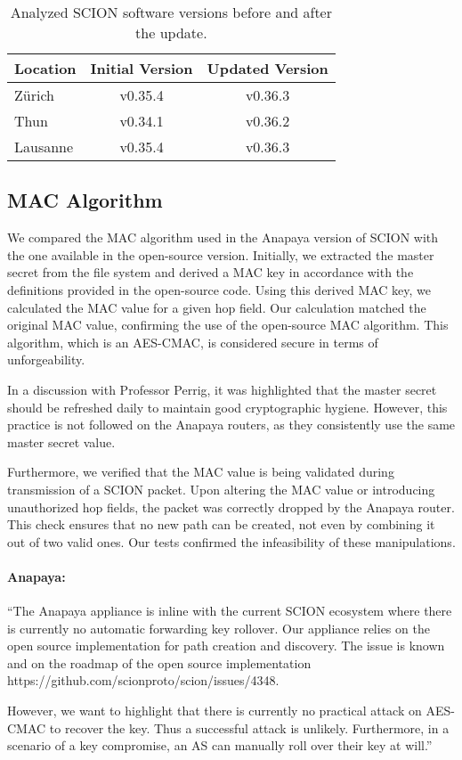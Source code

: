 \begin{table}[H]
    \centering
    \begin{tabular}{|l|c|c|}
        \hline
        \textbf{Location} & \textbf{Initial Version} & \textbf{Updated Version} \\
        \hline
        Zürich & v0.35.4 & v0.36.3 \\
        \hline
        Thun & v0.34.1 & v0.36.2 \\
        \hline
        Lausanne & v0.35.4 & v0.36.3 \\
        \hline
    \end{tabular}
    \caption{Analyzed SCION software versions before and after the update.}
    \label{tab:software_scion_versions}
\end{table}

\subsection{MAC Algorithm}
\label{sec:mac-algorithm}
We compared the MAC algorithm used in the Anapaya version of SCION with the one available in the open-source version.
Initially, we extracted the master secret from the file system and derived a MAC key in accordance with the definitions provided in the open-source code.
Using this derived MAC key, we calculated the MAC value for a given hop field.
Our calculation matched the original MAC value, confirming the use of the open-source MAC algorithm.
This algorithm, which is an AES-CMAC, is considered secure in terms of unforgeability.

In a discussion with Professor Perrig, it was highlighted that the master secret should be refreshed daily to maintain good cryptographic hygiene.
However, this practice is not followed on the Anapaya routers, as they consistently use the same master secret value.

Furthermore, we verified that the MAC value is being validated during transmission of a SCION packet.
Upon altering the MAC value or introducing unauthorized hop fields, the packet was correctly dropped by the Anapaya router.
This check ensures that no new path can be created, not even by combining it out of two valid ones.
Our tests confirmed the infeasibility of these manipulations.

\begin{boxH}
\paragraph{Anapaya:}
``The Anapaya appliance is inline with the current SCION ecosystem where there is currently no automatic forwarding key rollover. Our appliance relies on the open source implementation for path creation and discovery.
The issue is known and on the roadmap of the open source implementation https://github.com/scionproto/scion/issues/4348.

However, we want to highlight that there is currently no practical attack on AES-CMAC to recover the key.
Thus a successful attack is unlikely. Furthermore, in a scenario of a key compromise, an AS can manually roll over their key at will.''
\end{boxH}


